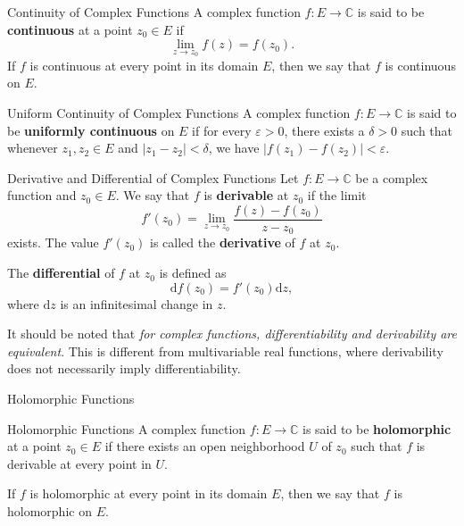 \begin{definition}{Continuity of Complex Functions}
    A complex function \(f: E \to \mathbb{C}\) is said to be \textbf{continuous} at a point \(z_0 \in E\) if 
    \[
    \lim_{z \to z_0} f(z) = f(z_0).
    \]
    If \(f\) is continuous at every point in its domain \(E\), then we say that \(f\) is continuous on \(E\).
\end{definition}

\begin{definition}{Uniform Continuity of Complex Functions}
    A complex function \(f: E \to \mathbb{C}\) is said to be \textbf{uniformly continuous} on \(E\) if 
    for every \(\varepsilon > 0\), there exists a \(\delta > 0\) such that 
    whenever \(z_1, z_2 \in E\) and \(|z_1 - z_2| < \delta\), we have \(|f(z_1) - f(z_2)| < \varepsilon\).
\end{definition}

\begin{definition}{Derivative and Differential of Complex Functions}
    Let \(f: E \to \mathbb{C}\) be a complex function and \(z_0 \in E\). 
    We say that \(f\) is \textbf{derivable} at \(z_0\) if the limit
    \[
    f'(z_0) = \lim_{z \to z_0} \frac{f(z) - f(z_0)}{z - z_0}
    \]
    exists. The value \(f'(z_0)\) is called the \textbf{derivative} of \(f\) at \(z_0\).
    
    The \textbf{differential} of \(f\) at \(z_0\) is defined as
    \[
    \mathrm{d}f(z_0) = f'(z_0) \mathrm{d}z,
    \]
    where \(\mathrm{d}z\) is an infinitesimal change in \(z\).
\end{definition}

\begin{note}
    It should be noted that \emph{for complex functions, differentiability and derivability are equivalent}. 
    This is different from multivariable real functions, where derivability does not necessarily imply differentiability. 
\end{note}

\begin{leftbarTitle}{Holomorphic Functions}\end{leftbarTitle}
\begin{definition}{Holomorphic Functions}
    A complex function \(f: E \to \mathbb{C}\) is said to be \textbf{holomorphic} at a point \(z_0 \in E\) if 
    there exists an open neighborhood \(U\) of \(z_0\) such that \(f\) is derivable at every point in \(U\).
    
    If \(f\) is holomorphic at every point in its domain \(E\), then we say that \(f\) is holomorphic on \(E\).
\end{definition}

